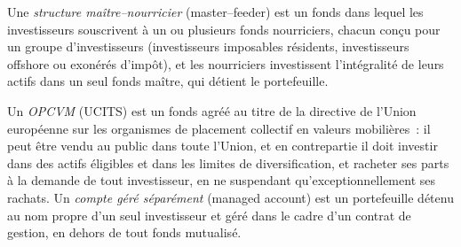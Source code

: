 \begin{definition}\label{def:fm:the-asset-manager-and-the-fund:master}
Une \emph{structure maître--nourricier} (master--feeder) est un fonds dans lequel les investisseurs souscrivent à un ou plusieurs fonds nourriciers, chacun
conçu pour un groupe d'investisseurs (investisseurs imposables résidents, investisseurs offshore ou exonérés d'impôt), et les nourriciers investissent l'intégralité de leurs actifs dans un seul
fonds maître, qui détient le portefeuille.
\end{definition}

\begin{definition}\label{def:fm:the-asset-manager-and-the-fund:ucits}
Un \emph{OPCVM} (UCITS) est un fonds agréé au titre de la directive de l'Union européenne sur les organismes de placement collectif en
valeurs mobilières~: il peut être vendu au public dans toute l'Union, et en contrepartie il doit investir dans des actifs éligibles et
dans les limites de diversification, et racheter ses parts à la demande de tout investisseur, en ne suspendant qu'exceptionnellement ses rachats. Un \emph{compte géré
séparément} (managed account) est un portefeuille détenu au nom propre d'un seul investisseur et géré
dans le cadre d'un contrat de gestion, en dehors de tout fonds mutualisé.
\end{definition}

